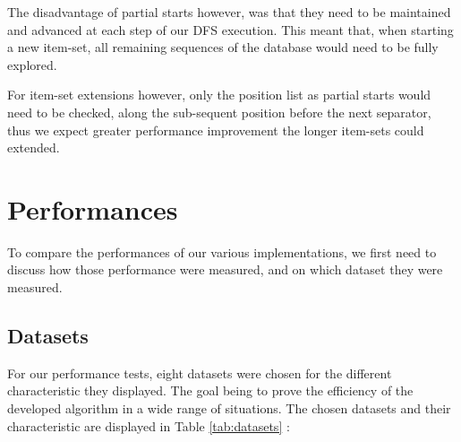 \documentclass{eplmastersthesis}
\begin{document}
The disadvantage of partial starts however, was that they need to be maintained and advanced at each step of our DFS execution. This meant that, when starting a new item-set, all remaining sequences of the database would need to be fully explored. \newline

For item-set extensions however, only the position list as partial starts would need to be checked, along the sub-sequent position before the next separator, thus we expect greater performance improvement the longer item-sets could extended. \newline


\section{Performances}

To compare the performances of our various implementations, we first need to discuss how those performance were measured, and on which dataset they were measured.

\subsection{Datasets}

For our performance tests, eight datasets were chosen for the different characteristic they displayed. The goal being to prove the efficiency of the developed algorithm in a wide range of situations. The chosen datasets and their characteristic are displayed in Table \ref{tab:datasets} : \newline
\end{document}
